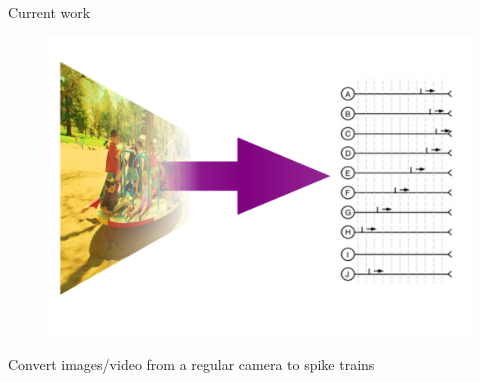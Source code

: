 \documentclass[17pt,mathserif]{beamer}
\begin{document}
            
        
    \begin{frame}{Current work}
        \vspace*{-3em}
        \begin{figure}
            \includegraphics[scale=0.4,trim=110 100 30 100, clip=true]{./images-to-spikes}
        \end{figure}
        \vspace*{-0.8em}
        \hspace*{0.05\textwidth}
        \begin{minipage}{0.9\textwidth}
          \centering \small Convert images/video from a regular camera to spike trains
        \end{minipage}
    \end{frame}
\end{document}
